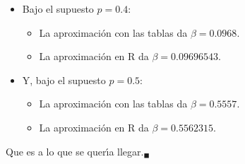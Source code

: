 \begin{solucion}
\begin{itemize}
  \item Bajo el supuesto $p = 0.4$:
  \begin{itemize}
   \item La aproximaci\'on con las tablas da $\beta = 0.0968$.
   \item La aproximaci\'on en R da $\beta = 0.09696543$.
  \end{itemize}

  \item Y, bajo el supuesto $p = 0.5$:
  \begin{itemize}
   \item La aproximaci\'on con las tablas da $\beta = 0.5557$.
   \item La aproximaci\'on en R da $\beta = 0.5562315$.
  \end{itemize}
 \end{itemize}
 Que es a lo que se quer\'{\i}a llegar.${}_{\blacksquare}$
\end{solucion}
